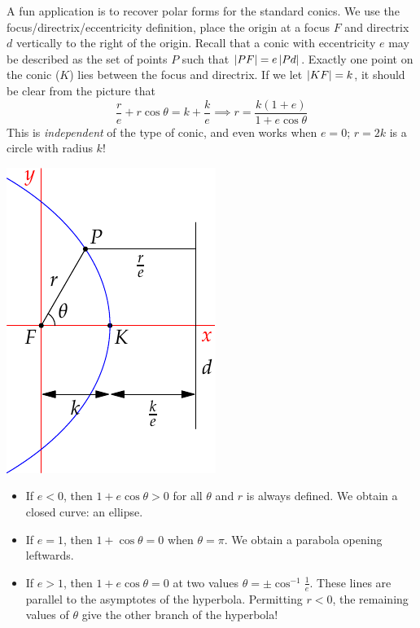 \iffalse
\begin{minipage}[t]{0.7\linewidth}\vspace{0pt}

A fun application is to recover polar forms for the standard conics. We use the focus/directrix/eccentricity definition, place the origin at a focus $F$ and directrix $d$ vertically to the right of the origin. Recall that a conic with eccentricity $e$ may be described as the set of points $P$ such that $\left| PF\right|=e\left| Pd\right|$. Exactly one point on the conic ($K$) lies between the focus and directrix. If we let $\left| KF\right|=k$, it should be clear from the picture that
\[\frac re+r\cos\theta=k+\frac ke \implies r=\frac{k(1+e)}{1+e\cos\theta}\]
This is \emph{independent} of the type of conic, and even works when $e=0$; $r=2k$ is a circle with radius $k$!
\end{minipage}\begin{minipage}[t]{0.3\linewidth}\vspace{0pt}
\flushright\includegraphics{eccentric}
\end{minipage}

\begin{itemize}
  \item If $e<0$, then $1+e\cos\theta>0$ for all $\theta$ and $r$ is always defined. We obtain a closed curve: an ellipse.
  \item If $e=1$, then $1+\cos\theta=0$ when $\theta=\pi$. We obtain a parabola opening leftwards.
  \item If $e>1$, then $1+e\cos\theta=0$ at two values $\theta=\pm\cos^{-1}\frac 1e$. These lines are parallel to the asymptotes of the hyperbola. Permitting $r<0$, the remaining values of $\theta$ give the other branch of the hyperbola!
\end{itemize}


